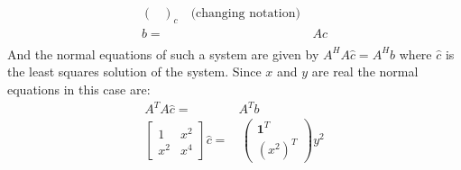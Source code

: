 \documentclass[letterpaper,12pt]{article}
\theoremstyle{definition}
\begin{document}
\begin{enumerate}
\begin{align*}
{\begin{pmatrix}
\end{pmatrix}}_c \quad \text{(changing notation)}\\
b=&\, Ac \\
\end{align*}
And the normal equations of such a system are given by $A^HA\hat{c}=A^Hb$ where $\hat{c}$ is the least squares solution of the system. Since $x$ and $y$ are real the normal equations in this case are:
\begin{align*}
A^TA\hat{c}=&A^Tb \\
\begin{bmatrix}
1 & x^2 \\ x^2 & x^4
\end{bmatrix} \hat{c} =& \, \begin{pmatrix}
\mathbf{1}^T \\ (x^2)^T
\end{pmatrix} y^2
\end{align*}
\end{enumerate}
\end{document}
